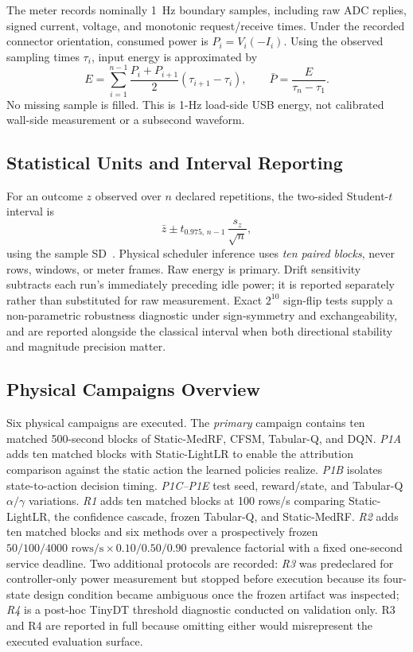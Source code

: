 The meter records nominally 1~Hz boundary samples, including raw ADC replies, signed current, voltage, and monotonic request/receive times. Under the recorded connector orientation, consumed power is $P_i=V_i(-I_i)$. Using the observed sampling times $\tau_i$, input energy is approximated by
\begin{equation}\label{eq:trap}
    E=\sum_{i=1}^{n-1}\frac{P_i+P_{i+1}}{2}(\tau_{i+1}-\tau_i),\qquad
    \bar P = \frac{E}{\tau_n-\tau_1}.
\end{equation}
No missing sample is filled. This is 1-Hz load-side USB energy, not calibrated wall-side measurement or a subsecond waveform.

\subsection{Statistical Units and Interval Reporting}
For an outcome $z$ observed over $n$ declared repetitions, the two-sided Student-$t$ interval is
\begin{equation}\label{eq:tci}
    \bar z\pm t_{0.975,\,n-1}\,\frac{s_z}{\sqrt n},
\end{equation}
using the sample SD~\cite{NISTMean}. Physical scheduler inference uses \emph{ten paired blocks}, never rows, windows, or meter frames. Raw energy is primary. Drift sensitivity subtracts each run's immediately preceding idle power; it is reported separately rather than substituted for raw measurement. Exact $2^{10}$ sign-flip tests supply a non-parametric robustness diagnostic under sign-symmetry and exchangeability, and are reported alongside the classical interval when both directional stability and magnitude precision matter.

\subsection{Physical Campaigns Overview}
Six physical campaigns are executed. The \emph{primary} campaign contains ten matched 500-second blocks of Static-MedRF, CFSM, Tabular-Q, and DQN. \emph{P1A} adds ten matched blocks with Static-LightLR to enable the attribution comparison against the static action the learned policies realize. \emph{P1B} isolates state-to-action decision timing. \emph{P1C--P1E} test seed, reward/state, and Tabular-Q $\alpha/\gamma$ variations. \emph{R1} adds ten matched blocks at 100 rows/s comparing Static-LightLR, the confidence cascade, frozen Tabular-Q, and Static-MedRF. \emph{R2} adds ten matched blocks and six methods over a prospectively frozen $50/100/4000\text{ rows/s}\times 0.10/0.50/0.90$ prevalence factorial with a fixed one-second service deadline. Two additional protocols are recorded: \emph{R3} was predeclared for controller-only power measurement but stopped before execution because its four-state design condition became ambiguous once the frozen artifact was inspected; \emph{R4} is a post-hoc TinyDT threshold diagnostic conducted on validation only. R3 and R4 are reported in full because omitting either would misrepresent the executed evaluation surface.
